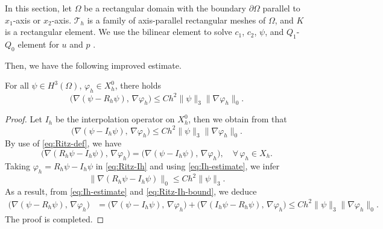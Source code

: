 In this section, let $\Omega$ be a rectangular domain with the boundary $\partial\Omega$
parallel to $x_{1}$-axis or $x_{2}$-axis. $\mathcal{T}_{h}$ is a family of axis-parallel
rectangular meshes of $\Omega$, and $K$ is a rectangular element. We use the bilinear element
to solve $c_{1}$, $c_{2}$, $\psi$, and $Q_{1}$-$Q_{0}$ element for $u$ and $p$
\cite{John2016}.

Then, we have the following improved estimate.

\begin{lemma}\label{lem:improved-l2}
For all $\psi\in H^{3}(\Omega)$, $\varphi_{h}\in X_{h}^{0}$, there holds
\begin{equation}\label{eq:improved-estimate}
  \bigl(\nabla(\psi - R_{h}\psi),\, \nabla\varphi_{h}\bigr)
  \leq Ch^{2}\|\psi\|_{3}\|\nabla\varphi_{h}\|_{0}.
\end{equation}
\end{lemma}

\begin{proof}
Let $I_{h}$ be the interpolation operator on $X_{h}^{0}$, then we obtain from
\cite{Lin2006} that
\begin{equation}\label{eq:Ih-estimate}
  \bigl(\nabla(\psi - I_{h}\psi),\, \nabla\varphi_{h}\bigr)
  \leq Ch^{2}\|\psi\|_{3}\|\nabla\varphi_{h}\|_{0}.
\end{equation}
By use of \eqref{eq:Ritz-def}, we have
\begin{equation}\label{eq:Ritz-Ih}
  \bigl(\nabla(R_{h}\psi - I_{h}\psi),\, \nabla\varphi_{h}\bigr)
  = \bigl(\nabla(\psi - I_{h}\psi),\, \nabla\varphi_{h}\bigr),
  \quad \forall\,\varphi_{h}\in X_{h}.
\end{equation}
Taking $\varphi_{h} = R_{h}\psi - I_{h}\psi$ in \eqref{eq:Ritz-Ih} and using
\eqref{eq:Ih-estimate}, we infer
\begin{equation}\label{eq:Ritz-Ih-bound}
  \bigl\|\nabla(R_{h}\psi - I_{h}\psi)\bigr\|_{0} \leq Ch^{2}\|\psi\|_{3}.
\end{equation}
As a result, from \eqref{eq:Ih-estimate} and \eqref{eq:Ritz-Ih-bound}, we deduce
\begin{align}
  \bigl(\nabla(\psi - R_{h}\psi),\, \nabla\varphi_{h}\bigr)
  &= \bigl(\nabla(\psi - I_{h}\psi),\, \nabla\varphi_{h}\bigr)
   + \bigl(\nabla(I_{h}\psi - R_{h}\psi),\, \nabla\varphi_{h}\bigr)
  \leq Ch^{2}\|\psi\|_{3}\|\nabla\varphi_{h}\|_{0}.
  \label{eq:improved-proof}
\end{align}
The proof is completed.
\end{proof}

